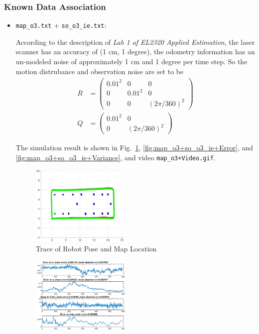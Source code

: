 \documentclass[conference]{IEEEtran}
\begin{document}
\subsubsection{Known Data Association}
	\begin{itemize}
		\item \texttt{map\_o3.txt} + \texttt{so\_o3\_ie.txt}:
			\par According to the description of \textit{Lab 1 of EL2320 Applied Estimation}, the laser scanner has an accuracy of (1 cm, 1 degree), the odometry information has an un-modeled noise of approximately 1 cm and 1 degree per time step. So the motion distrubance and observation noise are set to be
				\begin{align*}
					R & = \begin{pmatrix} 0.01^2 & 0 & 0 \\ 0 & 0.01^2 & 0 \\ 0 & 0 & (2\pi / 360)^2 \end{pmatrix} \\
					Q & = \begin{pmatrix} 0.01^2 & 0 \\ 0 & (2\pi/360)^2 \end{pmatrix}
				\end{align*}
			\par The simulation result is shown in Fig.~\ref{fig:map_o3+so_o3_ie+Trace}, \ref{fig:map_o3+so_o3_ie+Error}, and \ref{fig:map_o3+so_o3_ie+Variance}, and video \texttt{map\_o3+Video.gif}.
				\begin{figure}[htbp]
					\centering
					\includegraphics[width=0.45\textwidth]{map_o3+so_o3_ie+Trace.eps}
					\caption{Trace of Robot Pose and Map Location}
					\label{fig:map_o3+so_o3_ie+Trace}
				\end{figure}
				\begin{figure}[htbp]
					\centering
					\includegraphics[width=0.45\textwidth]{map_o3+so_o3_ie+Error.eps}

\end{figure}
\end{itemize}
\end{document}
